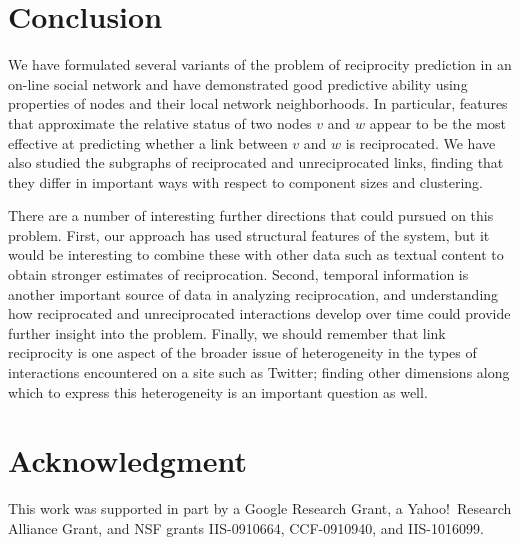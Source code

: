 \documentclass[conference]{IEEEtran}
\begin{document}
\section{Conclusion}

We have formulated several variants of the problem of 
reciprocity prediction in an on-line social network and have
demonstrated good predictive ability
using properties of nodes and their local network neighborhoods.
In particular, features that approximate the relative status of
two nodes $v$ and $w$ appear to be the most effective at 
predicting whether a link between $v$ and $w$ is reciprocated.
We have also studied the subgraphs of reciprocated and unreciprocated
links, finding that they differ in important ways with respect
to component sizes and clustering.

There are a number of interesting further directions that could
pursued on this problem.
First, our approach has used structural features of the system,
but it would be interesting to combine these with other
data such as textual content to obtain
stronger estimates of reciprocation.
Second, temporal information is another important source of data
in analyzing reciprocation, and understanding how reciprocated
and unreciprocated interactions develop over time could provide
further insight into the problem.
Finally, we should remember that link reciprocity is one aspect of
the broader issue of heterogeneity in the types of interactions
encountered on a site such as Twitter; finding other
dimensions along which to express this heterogeneity is an 
important question as well.


 \section*{Acknowledgment}
This work was supported in part by a Google Research Grant, a Yahoo!~Research Alliance Grant, and NSF grants IIS-0910664, CCF-0910940, and IIS-1016099.  


% 
% 
\end{document}
